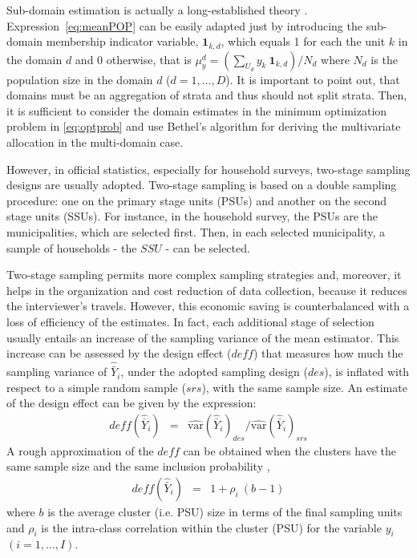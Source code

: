 Sub-domain estimation is actually a long-established theory 
\citep{SSW:03}. 
Expression~\eqref{eq:meanPOP} can be easily adapted just by introducing the sub-domain membership indicator variable, $\boldsymbol{1}_{k,d}$, which equals 1 for each the unit $k$ in the domain $d$ and 0 otherwise, that is
$
\label{eq:meanPOP_dom}
\mu_y^d = \left( {\sum_{U_d} y_k \ \boldsymbol{1}_{k,d}} \right) / {N_d}
$
where $N_d$ is the population size in the domain $d$ ($d=1, \dots, D$).
It is important to point out, that domains must be an aggregation of strata and thus should not split strata.
Then, it is sufficient to consider the domain estimates in the minimum optimization problem in \eqref{eq:optprob} and use Bethel's algorithm for deriving the multivariate allocation in the multi-domain case. 

However, in official statistics, especially for household surveys, two-stage sampling designs are usually adopted.
Two-stage sampling is based on a double sampling procedure: one on the primary stage units (PSUs) and another on the second stage units (SSUs).
For instance, in the household survey, the PSUs are the municipalities, which are selected first.
Then, in each selected municipality, a sample of households - the $SSU$ - can be selected.

Two-stage sampling permits more complex sampling strategies and, moreover, it helps in the organization and cost reduction of data collection, because it reduces the interviewer's travels.
However, this economic saving is counterbalanced with a loss of efficiency of the estimates.
In fact, each additional stage of selection usually entails an increase of the sampling variance of the mean estimator.
This increase can be assessed by the design effect ($deff$) that measures how much the sampling variance of $\hat{\bar{Y}}_{i}$, under the adopted sampling design ($des$), is inflated with respect to a simple random sample ($srs$), with the same sample size.
An estimate of the design effect can be given by the expression:
\begin{eqnarray*}
\label{eq:deff}
deff \left( \hat{\bar{Y}}_{i} \right) & = & {\widehat{\text{var}} \left( \hat{\bar{Y}}_{i}\right)_{des}} / {\widehat{\text{var}} \left(\hat{\bar{Y}}_{i}\right)_{srs}}
\end{eqnarray*} 
A rough approximation of the $deff$ can be obtained when the clusters have the same sample size and the same inclusion probability \citep{cicchitelli1992campionamento},
\begin{eqnarray}
	\label{eq:deff1}
	deff \left( \hat{\bar{Y}}_{i} \right) & = & 1+\rho_i \ (b-1)
\end{eqnarray} 
where $b$ is the average cluster (i.e. PSU) size in terms of the final sampling units and $\rho_i$ is the intra-class correlation within the cluster (PSU) for the variable $y_i$ $(i=1, \dots, I)$. 

